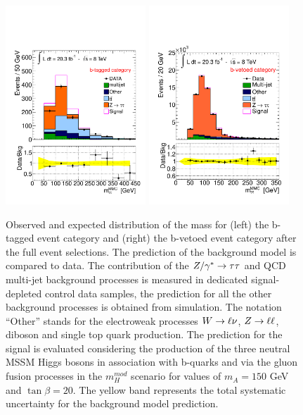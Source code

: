 \begin{figure}[tp]
     \begin{center}
            \includegraphics[width=0.47\textwidth]{figure/final_plots/Full_tag_qcd_reg.pdf}
            \includegraphics[width=0.47\textwidth]{figure/final_plots/Full_veto_qcd_reg.pdf}

    \end{center}
    \caption{ Observed and expected distribution of the \mmc mass for (left) the b-tagged event category and (right) the b-vetoed event category after
        the full event selections. The prediction of the  background model is compared to  data.
	The contribution of the $Z/\gamma^*\rightarrow \tau\tau$ and QCD multi-jet background processes is measured in  dedicated  signal-depleted control data samples,
	the prediction for all the other background processes is obtained from simulation. 
 	 The notation ``Other'' stands 	for the electroweak processes $W\rightarrow \ell \nu$, $Z\rightarrow \ell \ell$, diboson and single top quark production.
	The prediction for the signal is evaluated considering the production of the three neutral MSSM Higgs bosons in association with b-quarks
	and via the gluon fusion processes in the  $m_{H}^{mod}$ scenario for values of $m_A=150$ GeV and $\tan \beta =20$. 
	The yellow band represents the total systematic uncertainty for the background model prediction.
	}
   \label{fig:mmc_categories}
\end{figure}


